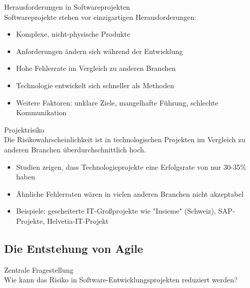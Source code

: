 \begin{concept}{Herausforderungen in Softwareprojekten}\\
    Softwareprojekte stehen vor einzigartigen Herausforderungen:
    \begin{itemize}
        \item Komplexe, nicht-physische Produkte
        \item Anforderungen ändern sich während der Entwicklung
        \item Hohe Fehlerrate im Vergleich zu anderen Branchen
        \item Technologie entwickelt sich schneller als Methoden
        \item Weitere Faktoren: unklare Ziele, mangelhafte Führung, schlechte Kommunikation
    \end{itemize}
\end{concept}

\begin{concept}{Projektrisiko}\\
    Die Risikowahrscheinlichkeit ist in technologischen Projekten im Vergleich zu anderen Branchen überdurchschnittlich hoch.
    \begin{itemize}
        \item Studien zeigen, dass Technologieprojekte eine Erfolgsrate von nur 30-35\% haben
        \item Ähnliche Fehlerraten wären in vielen anderen Branchen nicht akzeptabel
        \item Beispiele: gescheiterte IT-Großprojekte wie "Insieme" (Schweiz), SAP-Projekte, Helvetia-IT-Projekt
    \end{itemize}
\end{concept}

\subsection{Die Entstehung von Agile}

\begin{concept}{Zentrale Fragestellung}\\
    Wie kann das Risiko in Software-Entwicklungsprojekten reduziert werden?
\end{concept}

